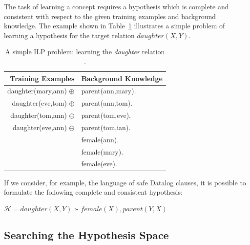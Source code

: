 The task of learning a concept requires a hypothesis which is complete and consistent with respect to the given
training examples and background knowledge. The example shown in Table~\ref{tab:ilpExample} illustrates a simple
problem of learning a hypothesis for the target relation
$daughter(X,Y)$.

\begin{table}[h!]
\caption{A simple ILP problem: learning the \emph{daughter} relation \citep{DBLP:journals/ml/LavracD96} .}
  \begin{center}
      \begin{tabular}{ r | l }
      \toprule
      \textbf{Training Examples} & \textbf{Background Knowledge}\\
      \midrule
      daughter(mary,ann) $\oplus$	& parent(ann,mary).	\\
      daughter(eve,tom) $\oplus$	& parent(ann,tom).	\\
      daughter(tom,ann) $\ominus$ 	& parent(tom,eve).	\\
      daughter(eve,ann) $\ominus$	& parent(tom,ian).	\\
					& female(ann).		\\
					& female(mary).		\\
					& female(eve).		\\
      \bottomrule
      \end{tabular}
  \label{tab:ilpExample}
  \end{center}
\end{table}

If we consider, for example, the language of safe Datalog clauses, it is possible to formulate the following complete
and consistent hypothesis:

\begin{center}
  $\mathcal{H} = daughter(X,Y)$ :- $female(X),parent(Y,X)$ 
\end{center}

\subsection{Searching the Hypothesis Space}


